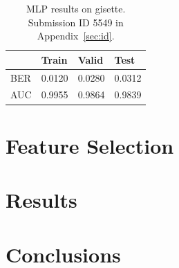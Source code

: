 \documentclass{ecsarticle}     %
\begin{document}
\begin{table}[h]
	\centering
	\begin{tabular}{|l|l|l|l|} \hline
     			& Train & Valid & Test \\ \hline
		BER & 0.0120 & 0.0280 & 0.0312 \\ \hline
		AUC & 0.9955 & 0.9864 & 0.9839 \\ \hline
	\end{tabular}
	\caption{MLP results on gisette. Submission ID 5549 in Appendix~\ref{sec:id}.}
	\label{tab:mlp_gisette}
\end{table}




\section{Feature Selection}




\section{Results}

\section{Conclusions}


\newpage



\end{document}
